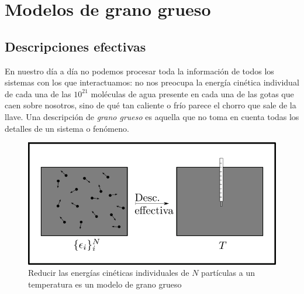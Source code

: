 \section{Modelos de grano grueso}\label{sec:Ch1CG}

\subsection{Descripciones efectivas}

En nuestro día a día no podemos procesar toda la información de todos los sistemas con los que interactuamos: no nos preocupa la energía cinética individual de cada una de las $10^{21}$ moléculas de agua presente en cada una de las gotas que caen sobre nosotros, sino de qué tan caliente o frío parece el chorro que sale de la llave. Una descripción de \textit{grano grueso} es aquella que no toma en cuenta todas los detalles de un sistema o fenómeno. 

\begin{figure}[ht]
    \centering
    \includegraphics[width=0.6\linewidth]{chapter1/figures/CGT.png}
    \caption{Reducir las energías cinéticas individuales de $N$ partículas a un temperatura es un modelo de grano grueso}
    \label{fig:KtoT}
\end{figure}


